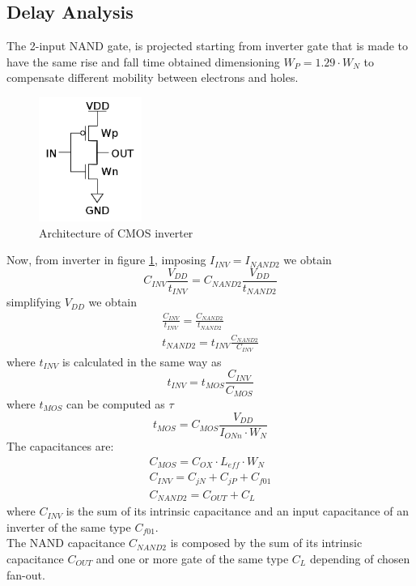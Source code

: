 \subsection{Delay Analysis}
The 2-input NAND gate, is projected starting from inverter gate that is made to have the same rise and fall time obtained dimensioning $W_P=1.29\cdotp W_N$ to compensate different mobility between electrons and holes.
\begin{figure}[htbp]
\begin{center}
\includegraphics[width=0.3\textwidth]{img/inverter.jpg}
\caption{Architecture of CMOS inverter}
\label{fig:inverter}
\end{center}
\end{figure}
Now, from inverter in figure \ref{fig:inverter}, imposing $I_{INV}=I_{NAND2}$ we obtain
\begin{equation}
C_{INV}\frac{V_{DD}}{t_{INV}} = C_{NAND2}\frac{V_{DD}}{t_{NAND2}}
\end{equation}
simplifying $V_{DD}$ we obtain
\begin{eqnarray}
\frac{C_{INV}}{t_{INV}} = \frac{C_{NAND2}}{t_{NAND2}}\\
t_{NAND2} = t_{INV} \frac{C_{NAND2}}{C_{INV}}
\end{eqnarray}
where $t_{INV}$ is calculated in the same way as
\begin{equation}
t_{INV} = t_{MOS} \frac{C_{INV}}{C_{MOS}}
\end{equation}
where $t_{MOS}$ can be computed as $\tau$
\begin{equation}
t_{MOS} = C_{MOS}\frac{V_{DD}}{I_{ONn}\cdotp W_N}
\end{equation}
The capacitances are:
\begin{eqnarray}
C_{MOS}=C_{OX}\cdotp L_{eff}\cdotp W_N\\
C_{INV}=C_{jN} + C_{jP} + C_{f01}\\
C_{NAND2}=C_{OUT}+C_L
\end{eqnarray}
where $C_{INV}$ is the sum of its intrinsic capacitance and an input capacitance of an inverter of the same type $C_{f01}$. \\The NAND capacitance $C_{NAND2}$ is composed by the sum of its intrinsic capacitance $C_{OUT}$ and one or more gate of the same type $C_L$ depending of chosen fan-out.
